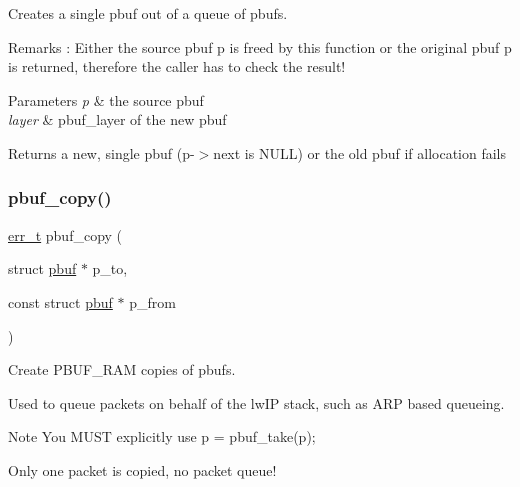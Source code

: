 Creates a single pbuf out of a queue of pbufs.

\begin{DoxyRemark}{Remarks}
\+: Either the source pbuf \textquotesingle{}p\textquotesingle{} is freed by this function or the original pbuf \textquotesingle{}p\textquotesingle{} is returned, therefore the caller has to check the result!
\end{DoxyRemark}

\begin{DoxyParams}{Parameters}
{\em p} & the source pbuf \\
\hline
{\em layer} & pbuf\+\_\+layer of the new pbuf\\
\hline
\end{DoxyParams}
\begin{DoxyReturn}{Returns}
a new, single pbuf (p-\/$>$next is N\+U\+LL) or the old pbuf if allocation fails 
\end{DoxyReturn}
\mbox{\label{group__pbuf_gaba88511dee3df4b631fde691f421320d}} 
\subsubsection{\texorpdfstring{pbuf\+\_\+copy()}{pbuf\_copy()}}
{\footnotesize\ttfamily \hyperlink{group__infrastructure__errors_gaf02d9da80fd66b4f986d2c53d7231ddb}{err\+\_\+t} pbuf\+\_\+copy (\begin{DoxyParamCaption}\item[{struct \hyperlink{structpbuf}{pbuf} $\ast$}]{p\+\_\+to,  }\item[{const struct \hyperlink{structpbuf}{pbuf} $\ast$}]{p\+\_\+from }\end{DoxyParamCaption})}

Create P\+B\+U\+F\+\_\+\+R\+AM copies of pbufs.

Used to queue packets on behalf of the lw\+IP stack, such as A\+RP based queueing.

\begin{DoxyNote}{Note}
You M\+U\+ST explicitly use p = pbuf\+\_\+take(p);

Only one packet is copied, no packet queue!
\end{DoxyNote}

